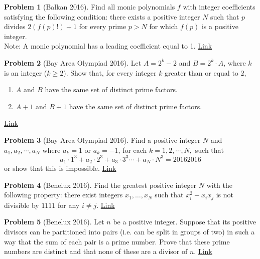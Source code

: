 \documentclass[]{article}
\theoremstyle{definition}
\newtheorem{problem}{Problem}
\begin{document}
	
\begin{problem}[Balkan 2016]
	Find all monic polynomials $f$ with integer coefficients satisfying the following condition: there exists a positive integer $N$ such that $p$ divides $2(f(p)!)+1$ for every prime $p>N$ for which $f(p)$ is a positive integer.
	\\
	Note: A monic polynomial has a leading coefficient equal to 1. \hfill \href{http://artofproblemsolving.com/community/c6h1239091p6316984}{Link}
\end{problem}


	
\begin{problem}[Bay Area Olympiad 2016]
	Let $A=2^k - 2$ and $B= 2^k \cdot A$, where $k$ is an integer ($k \ge 2$).
	Show that, for every integer $k$ greater than or equal to $2$,
		\begin{enumerate}
			\item $A$ and $B$ have the same set of distinct prime factors.
			\item $A+1$ and $B+1$ have the same set of distinct prime factors.
		\end{enumerate}
	\flushright \href{http://artofproblemsolving.com/community/c6h1203225p5926002}{Link}
\end{problem}


	
\begin{problem}[Bay Area Olympiad 2016]
	Find a positive integer $N$ and $a_1, a_2, \cdots, a_N$ where $a_k = 1$ or $a_k = -1$, for each $k=1,2,\cdots,N,$ such that $$a_1 \cdot 1^3 + a_2 \cdot 2^3 + a_3 \cdot 3^3 \cdots + a_N \cdot N^3 = 20162016$$or show that this is impossible. \hfill \href{http://artofproblemsolving.com/community/c6h1203525p5929703}{Link}
\end{problem}


	
\begin{problem}[Benelux 2016]
	Find the greatest positive integer $N$ with the following property: there exist integers $x_1, \dots, x_N$ such that $x^2_i - x_ix_j$ is not divisible by $1111$ for any $i\ne j.$ \hfill \href{http://artofproblemsolving.com/community/c6h1236281p6284414}{Link}
\end{problem}


	
\begin{problem}[Benelux 2016]
	Let $n$ be a positive integer. Suppose that its positive divisors can be partitioned into pairs (i.e. can be split in groups of two) in such a way that the sum of each pair is a prime number. Prove that these prime numbers are distinct and that none of these are a divisor of $n.$ \hfill \href{http://artofproblemsolving.com/community/c6h1236282p6284421}{Link}
\end{problem}
\end{document}
